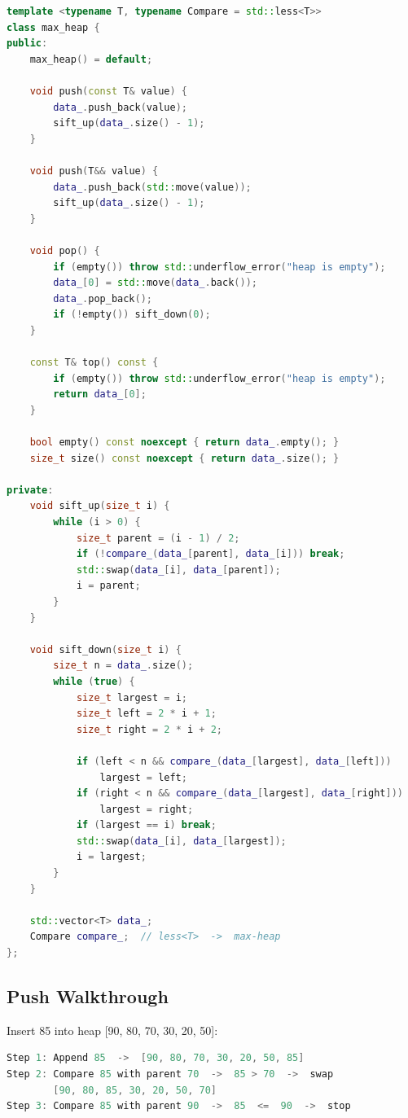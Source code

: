 \begin{lstlisting}[language=C++]
template <typename T, typename Compare = std::less<T>>
class max_heap {
public:
    max_heap() = default;

    void push(const T& value) {
        data_.push_back(value);
        sift_up(data_.size() - 1);
    }

    void push(T&& value) {
        data_.push_back(std::move(value));
        sift_up(data_.size() - 1);
    }

    void pop() {
        if (empty()) throw std::underflow_error("heap is empty");
        data_[0] = std::move(data_.back());
        data_.pop_back();
        if (!empty()) sift_down(0);
    }

    const T& top() const {
        if (empty()) throw std::underflow_error("heap is empty");
        return data_[0];
    }

    bool empty() const noexcept { return data_.empty(); }
    size_t size() const noexcept { return data_.size(); }

private:
    void sift_up(size_t i) {
        while (i > 0) {
            size_t parent = (i - 1) / 2;
            if (!compare_(data_[parent], data_[i])) break;
            std::swap(data_[i], data_[parent]);
            i = parent;
        }
    }

    void sift_down(size_t i) {
        size_t n = data_.size();
        while (true) {
            size_t largest = i;
            size_t left = 2 * i + 1;
            size_t right = 2 * i + 2;

            if (left < n && compare_(data_[largest], data_[left]))
                largest = left;
            if (right < n && compare_(data_[largest], data_[right]))
                largest = right;
            if (largest == i) break;
            std::swap(data_[i], data_[largest]);
            i = largest;
        }
    }

    std::vector<T> data_;
    Compare compare_;  // less<T>  ->  max-heap
};
\end{lstlisting}

\subsection{Push Walkthrough}

Insert 85 into heap [90, 80, 70, 30, 20, 50]:

\begin{lstlisting}[language=Java]
Step 1: Append 85  ->  [90, 80, 70, 30, 20, 50, 85]
Step 2: Compare 85 with parent 70  ->  85 > 70  ->  swap
        [90, 80, 85, 30, 20, 50, 70]
Step 3: Compare 85 with parent 90  ->  85  <=  90  ->  stop
\end{lstlisting}

